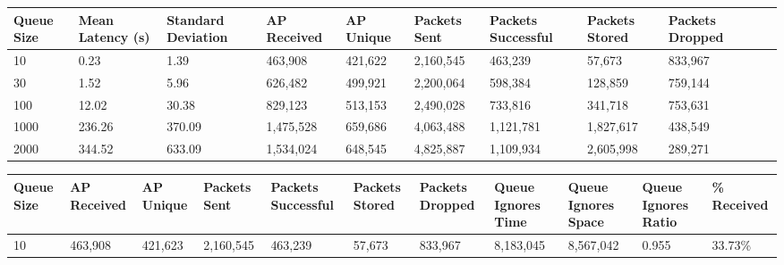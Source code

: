         \begin{landscape}
            \begin{table}
                \centering
                \begin{tabularx}{\linewidth}{|X|X|X|X|X|X|X|X|X|X|X|}
                    \hline
                    \multicolumn{1}{|X|}{\centering Queue Size} & \multicolumn{1}{|X|}{\centering Mean Latency (s)} & \multicolumn{1}{|X|}{\centering Standard Deviation} & \multicolumn{1}{|X|}{\centering AP Received} & \multicolumn{1}{|X|}{\centering AP Unique} & \multicolumn{1}{|X|}{\centering Packets Sent} & \multicolumn{1}{|X|}{\centering Packets Successful} & \multicolumn{1}{|X|}{\centering Packets Stored} & \multicolumn{1}{|X|}{\centering Packets Dropped} \\
                    \hline
                    10 & 0.23 & 1.39 & 463,908 & 421,622 & 2,160,545 & 463,239 & 57,673 & 833,967 \\
                    30 & 1.52 & 5.96 & 626,482 & 499,921 & 2,200,064 & 598,384 & 128,859 & 759,144 \\
                    100 & 12.02 & 30.38 & 829,123 & 513,153 & 2,490,028 & 733,816 & 341,718 & 753,631 \\
                    1000 & 236.26 & 370.09 & 1,475,528 & 659,686 & 4,063,488 & 1,121,781 & 1,827,617 & 438,549 \\
                    2000 & 344.52 & 633.09 & 1,534,024 & 648,545 & 4,825,887 & 1,109,934 & 2,605,998 & 289,271 \\
                    \hline
                \end{tabularx}
            \end{table}
            \begin{table}
                \centering
                \begin{tabularx}{\linewidth}{|X|X|X|X|X|X|X|X|X|X|X|}
                    \hline
                    \multicolumn{1}{|X|}{\centering Queue Size} & \multicolumn{1}{|X|}{\centering AP Received} & \multicolumn{1}{|X|}{\centering AP Unique} & \multicolumn{1}{|X|}{\centering Packets Sent} & \multicolumn{1}{|X|}{\centering Packets Successful} & \multicolumn{1}{|X|}{\centering Packets Stored} & \multicolumn{1}{|X|}{\centering Packets Dropped} & \multicolumn{1}{|X|}{\centering Queue Ignores Time} & \multicolumn{1}{|X|}{\centering Queue Ignores Space} & \multicolumn{1}{|X|}{\centering Queue Ignores Ratio} & \multicolumn{1}{|X|}{\centering \% Received} \\
                    \hline
                    10 & 463,908 & 421,623 & 2,160,545 & 463,239 & 57,673 & 833,967 & 8,183,045 & 8,567,042 & 0.955 & 33.73\% \\

\end{tabularx}
\end{table}
\end{landscape}
